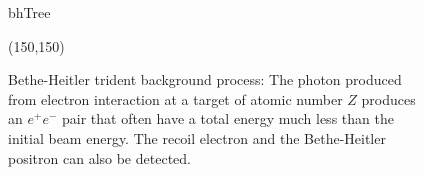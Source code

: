 \begin{figure}[htb]
    \begin{center}
	\begin{fmffile}{bhTree}
	\begin{fmfgraph*}(150,150)
	\fmfstraight
		\fmffreeze
		\fmffreeze	
	\end{fmfgraph*}
	\end{fmffile}
  	\end{center}
    	\caption[Bethe-Heitler background]{Bethe-Heitler trident background process: The photon produced from electron interaction at a target of atomic number $Z$ produces an $e^+e^-$ pair that often have a total energy much less than the initial beam energy. The recoil electron and the Bethe-Heitler positron can also be detected.}
   	 \label{fig:bhTree}	
\end{figure}